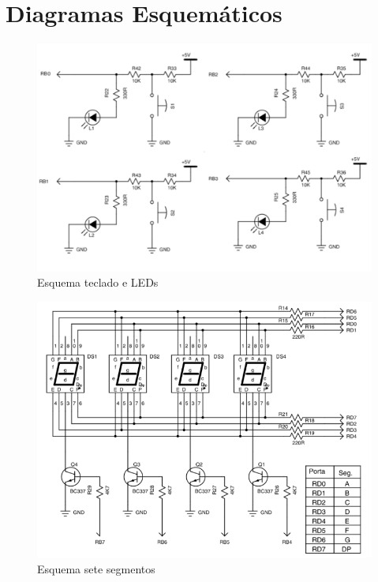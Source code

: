 \documentclass{article}
\begin{document}
\section{Diagramas Esquemáticos}

\begin{figure}[H]
	\centering
	\includegraphics[width=0.7\linewidth]{esq_ledswi}
	\caption{Esquema teclado e LEDs}
	\label{fig:esq_ledswi}
\end{figure}
\begin{figure}[H]
	\centering
	\includegraphics[width=0.9\linewidth]{esq_7seg}
	\caption{Esquema sete segmentos}
	\label{fig:esq_7seg}
\end{figure}
\end{document}
